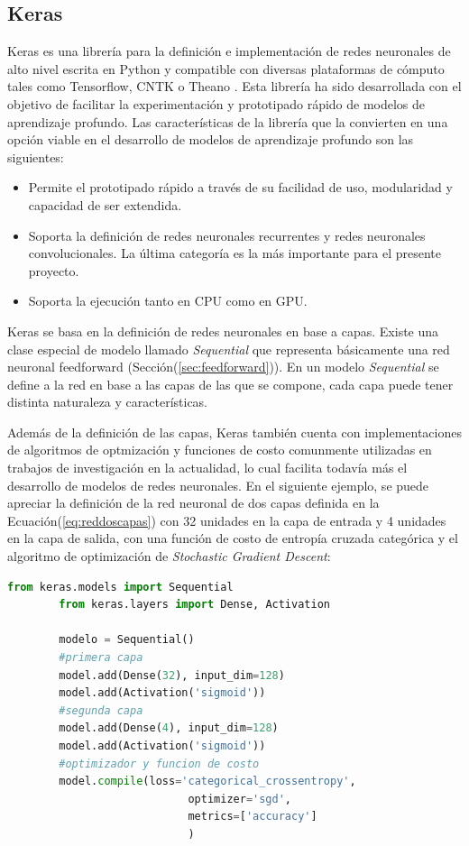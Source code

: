     \subsection{Keras}
    Keras es una librería para la definición e implementación de redes neuronales de alto nivel escrita en Python y compatible con 
    diversas plataformas de cómputo tales como Tensorflow, CNTK o Theano \cite{chollet2015keras}. Esta librería ha sido desarrollada con el objetivo de 
    facilitar la experimentación y prototipado rápido de modelos de aprendizaje profundo. Las características de la librería que 
    la convierten en una opción viable en el desarrollo de modelos de aprendizaje profundo son las siguientes:

    \begin{itemize}
        \item Permite el prototipado rápido a través de su facilidad de uso, modularidad y capacidad de ser extendida.
        \item Soporta la definición de redes neuronales recurrentes y redes neuronales convolucionales. La última categoría es la más importante para el presente proyecto.
        \item Soporta la ejecución tanto en CPU como en GPU.
    \end{itemize}

    Keras se basa en la definición de redes neuronales en base a capas. Existe una clase especial de modelo llamado \textit{Sequential} que 
    representa básicamente una red neuronal feedforward (Sección(\ref{sec:feedforward})). En un modelo \textit{Sequential} se define 
    a la red en base a las capas de las que se compone, cada capa puede tener distinta naturaleza y características. 
    
    Además de la definición de las capas, Keras también cuenta con implementaciones de algoritmos de optmización y funciones de costo 
    comunmente utilizadas en trabajos de investigación en la actualidad, lo cual facilita todavía más el desarrollo de modelos de 
    redes neuronales. En el siguiente 
    ejemplo, se puede apreciar la definición de la red neuronal de dos capas definida en la Ecuación(\ref{eq:reddoscapas}) con 32 unidades en 
    la capa de entrada y 4 unidades en la capa de salida, con una función de costo de entropía cruzada categórica y el algoritmo de 
    optimización de \textit{Stochastic Gradient Descent}:

    \begin{lstlisting}[title={Ejemplo de una red neuronal usando la librería Keras},captionpos=b,language=Python]
        from keras.models import Sequential
        from keras.layers import Dense, Activation

        modelo = Sequential()
        #primera capa
        model.add(Dense(32), input_dim=128)
        model.add(Activation('sigmoid'))
        #segunda capa
        model.add(Dense(4), input_dim=128)
        model.add(Activation('sigmoid'))
        #optimizador y funcion de costo
        model.compile(loss='categorical_crossentropy',
                            optimizer='sgd',
                            metrics=['accuracy']
                            )
    \end{lstlisting}

